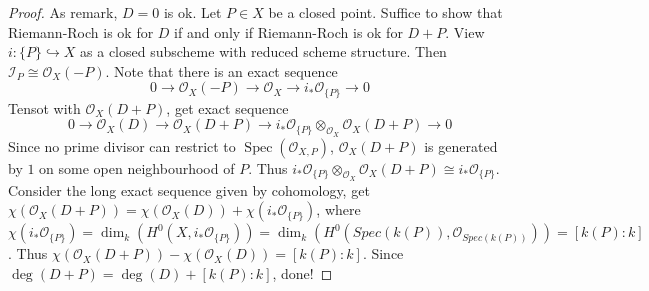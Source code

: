 \documentclass{ctexart}
\newcommand{\spec}{\operatorname{Spec}}
\begin{document}
\begin{proof}
    As remark, $D = 0$ is ok.
    Let $P\in X$ be a closed point.
    Suffice to show that Riemann-Roch is ok for $D$ if and only if Riemann-Roch is ok for $D + P$.
    View $i: \{P\} \hookrightarrow  X$ as a closed subscheme with reduced scheme structure.
    Then $\mathcal{I}_{P} \cong \mathcal{O}_{X}(-P)$.
    Note that there is an exact sequence
    \begin{equation*}
        0 \longrightarrow \mathcal{O}_{X}(-P) \longrightarrow \mathcal{O}_{X} \longrightarrow i_{\ast}\mathcal{O}_{\{P\}} \longrightarrow 0
    \end{equation*}
    Tensot with $\mathcal{O}_{X}(D + P)$, get exact sequence
    \begin{equation*}
        0 \longrightarrow \mathcal{O}_{X}(D) \longrightarrow \mathcal{O}_{X}(D + P) \longrightarrow i_{\ast}\mathcal{O}_{\{P\}} \otimes_{\mathcal{O}_{X}} \mathcal{O}_{X}(D + P) \longrightarrow 0
    \end{equation*}
    Since no prime divisor can restrict to $\spec(\mathcal{O}_{X, P})$, $\mathcal{O}_{X}(D + P)$ is generated by $1$ on some open neighbourhood of $P$.
    Thus $i_{\ast}\mathcal{O}_{\{P\}} \otimes_{\mathcal{O}_{X}} \mathcal{O}_{X}(D + P) \cong i_{\ast}\mathcal{O}_{\{P\}}$.
    Consider the long exact sequence given by cohomology, get $\chi(\mathcal{O}_{X}(D + P)) = \chi(\mathcal{O}_{X}(D)) + \chi(i_{\ast}\mathcal{O}_{\{P\}})$,
    where $\chi(i_{\ast}\mathcal{O}_{\{P\}}) = \dim_{k}(H^{0}(X, i_{\ast}\mathcal{O}_{\{P\}})) = \dim_{k}(H^{0}(Spec(k(P)), \mathcal{O}_{Spec(k(P))})) = [k(P) : k]$.
    Thus $\chi(\mathcal{O}_{X}(D + P)) - \chi(\mathcal{O}_{X}(D)) = [k(P) : k]$.
    Since $\deg(D + P) = \deg(D) + [k(P) : k]$, done!
\end{proof}
\end{document}

